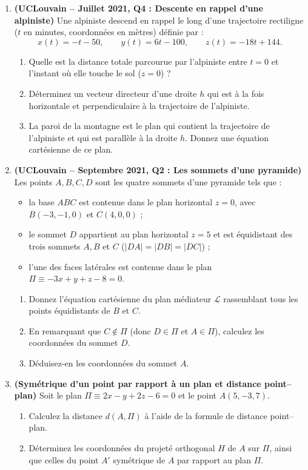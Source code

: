 \begin{enumerate}[label=\textbf{Exercice 7.\arabic* --}, align=left, leftmargin=*]
    \item \textbf{(UCLouvain -- Juillet 2021, Q4 : Descente en rappel d'une alpiniste)}
    Une alpiniste descend en rappel le long d'une trajectoire rectiligne ($t$ en minutes, coordonnées en mètres) définie par :
    \[
        x(t) = -t - 50, \qquad y(t) = 6t - 100, \qquad z(t) = -18t + 144.
    \]
    \begin{enumerate}[label=(\alph*)]
        \item Quelle est la distance totale parcourue par l'alpiniste entre $t = 0$ et l'instant où elle touche le sol ($z = 0$) ?
        \item Déterminez un vecteur directeur d'une droite $h$ qui est à la fois horizontale et perpendiculaire à la trajectoire de l'alpiniste.
        \item La paroi de la montagne est le plan qui contient la trajectoire de l'alpiniste et qui est parallèle à la droite $h$. Donnez une équation cartésienne de ce plan.
    \end{enumerate}

    \item \textbf{(UCLouvain -- Septembre 2021, Q2 : Les sommets d'une pyramide)}
    Les points $A, B, C, D$ sont les quatre sommets d'une pyramide tels que :
    \begin{itemize}
        \item la base $ABC$ est contenue dans le plan horizontal $z = 0$, avec $B(-3, -1, 0)$ et $C(4, 0, 0)$ ;
        \item le sommet $D$ appartient au plan horizontal $z = 5$ et est équidistant des trois sommets $A, B$ et $C$ ($|DA| = |DB| = |DC|$) ;
        \item l'une des faces latérales est contenue dans le plan $\Pi \equiv -3x + y + z - 8 = 0$.
    \end{itemize}
    \begin{enumerate}[label=(\alph*)]
        \item Donnez l'équation cartésienne du plan médiateur $\mathcal{L}$ rassemblant tous les points équidistants de $B$ et $C$.
        \item En remarquant que $C \notin \Pi$ (donc $D \in \Pi$ et $A \in \Pi$), calculez les coordonnées du sommet $D$.
        \item Déduisez-en les coordonnées du sommet $A$.
    \end{enumerate}

    \item \textbf{(Symétrique d'un point par rapport à un plan et distance point--plan)}
    Soit le plan $\Pi \equiv 2x - y + 2z - 6 = 0$ et le point $A(5, -3, 7)$.
    \begin{enumerate}[label=(\alph*)]
        \item Calculez la distance $d(A, \Pi)$ à l'aide de la formule de distance point--plan.
        \item Déterminez les coordonnées du projeté orthogonal $H$ de $A$ sur $\Pi$, ainsi que celles du point $A'$ symétrique de $A$ par rapport au plan $\Pi$.
    \end{enumerate}


\end{enumerate}
